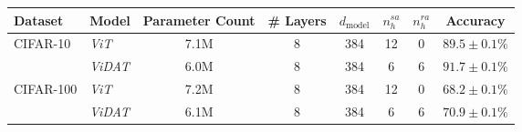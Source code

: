 \begin{tabular}{l|l|ccccc|c}
\toprule
Dataset & Model & Parameter Count & \# Layers & $d_{\text{model}}$ & $n_h^{sa}$ & $n_h^{ra}$ & Accuracy \\
\midrule
\multirow{2}{*}{CIFAR-10} & \textit{ViT} & 7.1M & 8 & 384 & 12 & 0 &  $89.5 \pm 0.1\%$ \\
          & \textit{ViDAT} & 6.0M & 8 & 384 & 6  & 6 &  $\bm{91.7 \pm 0.1\%}$ \\
\midrule
\multirow{2}{*}{CIFAR-100} & \textit{ViT} & 7.2M & 8 & 384 & 12 & 0 &  $68.2 \pm 0.1\%$ \\
          & \textit{ViDAT} & 6.1M & 8 & 384 & 6  & 6 &  $\bm{70.9 \pm 0.1\%}$ \\
\bottomrule
\end{tabular}
